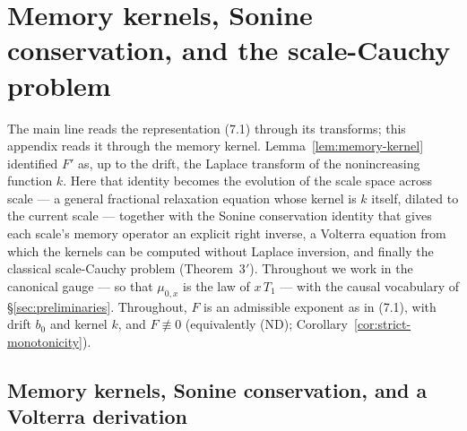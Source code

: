 
\section{Memory kernels, Sonine conservation, and the scale-Cauchy problem}\label{sec:appendix-memory}

The main line reads the representation (7.1) through its transforms; this appendix reads it
through the memory kernel. Lemma~\ref{lem:memory-kernel} identified $F'$ as, up to the drift,
the Laplace transform of the nonincreasing function $k$. Here that identity becomes the
evolution of the scale space across scale --- a general fractional relaxation equation whose
kernel is $k$ itself, dilated to the current scale --- together with the Sonine conservation
identity that gives each scale's memory operator an explicit right inverse, a Volterra equation from
which the kernels can be computed without Laplace inversion, and finally the classical
scale-Cauchy problem (Theorem~3$'$). Throughout we work in the canonical gauge --- so that
$\mu_{0,x}$ is the law of $x\,T_1$ --- with the causal vocabulary of \S\ref{sec:preliminaries}.
Throughout, $F$ is an admissible exponent as in (7.1), with drift $b_0$ and kernel $k$, and
$F \not\equiv 0$ (equivalently (ND); Corollary~\ref{cor:strict-monotonicity}).

\subsection{Memory kernels, Sonine conservation, and a Volterra derivation}\label{sec:appendix-sonine}

